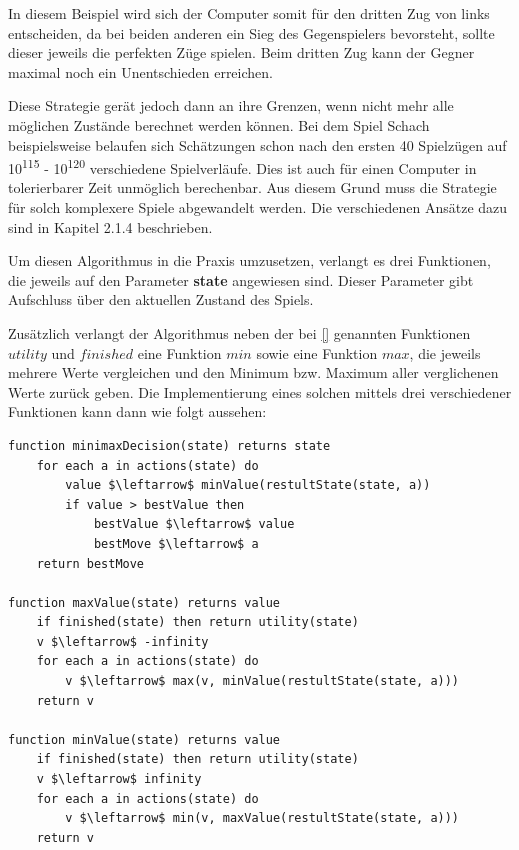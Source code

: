 In diesem Beispiel wird sich der Computer somit für den dritten Zug von links entscheiden, da bei beiden anderen ein Sieg des Gegenspielers bevorsteht, sollte dieser jeweils die perfekten Züge spielen. Beim dritten Zug kann der Gegner maximal noch ein Unentschieden erreichen.

Diese Strategie gerät jedoch dann an ihre Grenzen, wenn nicht mehr alle möglichen Zustände berechnet werden können. Bei dem Spiel Schach beispielsweise belaufen sich Schätzungen schon nach den ersten 40 Spielzügen auf 10\textsuperscript{115} - 10\textsuperscript{120} verschiedene Spielverläufe. Dies ist auch für einen Computer in tolerierbarer  Zeit unmöglich berechenbar. Aus diesem Grund muss die Strategie für solch komplexere Spiele abgewandelt werden. Die verschiedenen Ansätze dazu sind in Kapitel 2.1.4 beschrieben.


Um diesen Algorithmus in die Praxis umzusetzen, verlangt es drei Funktionen, die jeweils auf den Parameter \textbf{state} angewiesen sind. Dieser Parameter gibt Aufschluss über den aktuellen Zustand des Spiels.

Zusätzlich verlangt der Algorithmus neben der bei \ref{} genannten Funktionen $utility$ und $finished$ eine Funktion $min$ sowie eine Funktion $max$, die jeweils mehrere Werte vergleichen und den Minimum bzw. Maximum aller verglichenen Werte zurück geben. Die Implementierung eines solchen mittels drei verschiedener Funktionen kann dann wie folgt aussehen:

\begin{lstlisting}[mathescape]
function minimaxDecision(state) returns state
	for each a in actions(state) do
		value $\leftarrow$ minValue(restultState(state, a))
		if value > bestValue then
			bestValue $\leftarrow$ value
			bestMove $\leftarrow$ a
	return bestMove
	
function maxValue(state) returns value
	if finished(state) then return utility(state)
	v $\leftarrow$ -infinity
	for each a in actions(state) do
		v $\leftarrow$ max(v, minValue(restultState(state, a)))
	return v
	
function minValue(state) returns value
	if finished(state) then return utility(state)
	v $\leftarrow$ infinity
	for each a in actions(state) do
		v $\leftarrow$ min(v, maxValue(restultState(state, a)))
	return v
\end{lstlisting}

